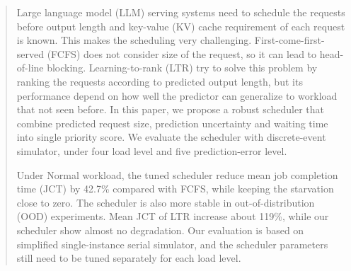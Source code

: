 \begin{abstract}

Large language model (LLM) serving systems need to schedule the requests before output length and key-value (KV) cache requirement of each request is known. This makes the scheduling very challenging. First-come-first-served (FCFS) does not consider size of the request, so it can lead to head-of-line blocking. Learning-to-rank (LTR) try to solve this problem by ranking the requests according to predicted output length, but its performance depend on how well the predictor can generalize to workload that not seen before. In this paper, we propose a robust scheduler that combine predicted request size, prediction uncertainty and waiting time into single priority score. We evaluate the scheduler with discrete-event simulator, under four load level and five prediction-error level.

Under Normal workload, the tuned scheduler reduce mean job completion time (JCT) by 42.7\% compared with FCFS, while keeping the starvation close to zero. The scheduler is also more stable in out-of-distribution (OOD) experiments. Mean JCT of LTR increase about 119\%, while our scheduler show almost no degradation. Our evaluation is based on simplified single-instance serial simulator, and the scheduler parameters still need to be tuned separately for each load level.

\end{abstract}